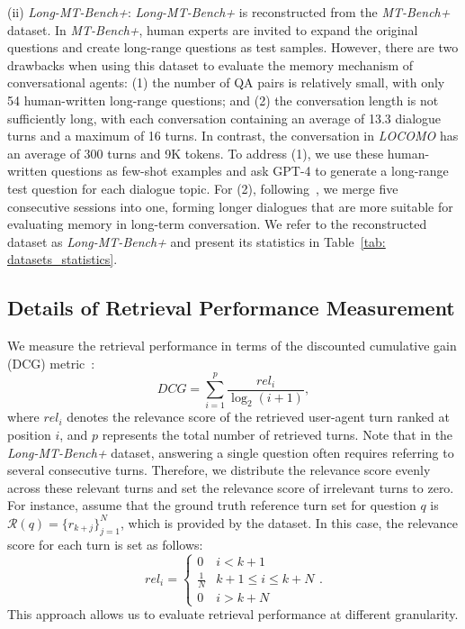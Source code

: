 (ii) \textit{Long-MT-Bench+}: \textit{Long-MT-Bench+} is reconstructed from the 
\textit{MT-Bench+}~\citep{lu2023memochat} dataset. In \textit{MT-Bench+}, human experts are invited to expand the original questions and create long-range questions as test samples. However, there are two drawbacks when using this dataset to evaluate the memory mechanism of conversational agents: (1) the number of QA pairs is relatively small, with only 54 human-written long-range questions; and (2) the conversation length is not sufficiently long, with each conversation containing an average of 13.3 dialogue turns and a maximum of 16 turns. In contrast, the conversation in \textit{LOCOMO} has an average of 300 turns and 9K tokens. To address (1), we use these human-written questions as few-shot examples and ask GPT-4 to generate a long-range test question for each dialogue topic. For (2), following~\citep{yuan2023evolving}, we merge five consecutive sessions into one, forming longer dialogues that are more suitable for evaluating memory in long-term conversation. We refer to the reconstructed dataset as \textit{Long-MT-Bench+} and present its statistics in Table~\ref{tab: datasets_statistics}.



\subsection{Details of Retrieval Performance Measurement}
\label{sec: retrieval_measurement}

We measure the retrieval performance in terms of the discounted cumulative gain (DCG) metric~\citep{jarvelin2002cumulated}: 
\begin{equation} 
\textit{DCG}=\sum_{i=1}^{p}\frac{rel_{i}}{\log_{2}(i+1)}, 
\label{eq: dcg} 
\end{equation} 
where $rel_{i}$ denotes the relevance score of the retrieved user-agent turn ranked at position $i$, and $p$ represents the total number of retrieved turns. Note that in the \textit{Long-MT-Bench+} dataset, answering a single question often requires referring to several consecutive turns. Therefore, we distribute the relevance score evenly across these relevant turns and set the relevance score of irrelevant turns to zero. For instance, assume that the ground truth reference turn set for question $q$ is $\mathcal{R}(q) = \{r_{k+j}\}_{j=1}^{N}$, which is provided by the dataset. In this case, the relevance score for each turn is set as follows:
$$
\textit{rel}_{i} =
\begin{cases}
0 & i < k+1 \\ 
\frac{1}{N} & k+1 \leq i \leq k+N \\ 
0 & i > k+N
\end{cases}.
$$
This approach allows us to evaluate retrieval performance at different granularity.

